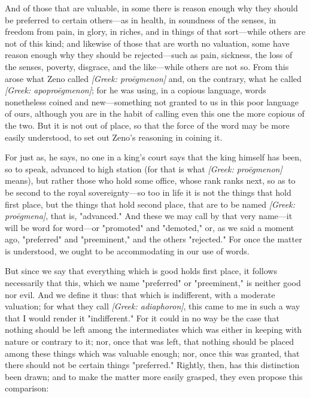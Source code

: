  And of those that are valuable, in some there is reason enough why they should be preferred to certain others—as in health, in soundness of the senses, in freedom from pain, in glory, in riches, and in things of that sort—while others are not of this kind; and likewise of those that are worth no valuation, some have reason enough why they should be rejected—such as pain, sickness, the loss of the senses, poverty, disgrace, and the like—while others are not so. From this arose what Zeno called \textit{[Greek: proēgmenon]} and, on the contrary, what he called \textit{[Greek: apoproēgmenon]}; for he was using, in a copious language, words nonetheless coined and new—something not granted to us in this poor language of ours, although you are in the habit of calling even this one the more copious of the two. But it is not out of place, so that the force of the word may be more easily understood, to set out Zeno's reasoning in coining it.

 For just as, he says, no one in a king's court says that the king himself has been, so to speak, advanced to high station (for that is what \textit{[Greek: proēgmenon]} means), but rather those who hold some office, whose rank ranks next, so as to be second to the royal sovereignty—so too in life it is not the things that hold first place, but the things that hold second place, that are to be named \textit{[Greek: proēgmena]}, that is, "advanced." And these we may call by that very name—it will be word for word—or "promoted" and "demoted," or, as we said a moment ago, "preferred" and "preeminent," and the others "rejected." For once the matter is understood, we ought to be accommodating in our use of words.

 But since we say that everything which is good holds first place, it follows necessarily that this, which we name "preferred" or "preeminent," is neither good nor evil. And we define it thus: that which is indifferent, with a moderate valuation; for what they call \textit{[Greek: adiaphoron]}, this came to me in such a way that I would render it "indifferent." For it could in no way be the case that nothing should be left among the intermediates which was either in keeping with nature or contrary to it; nor, once that was left, that nothing should be placed among these things which was valuable enough; nor, once this was granted, that there should not be certain things "preferred." Rightly, then, has this distinction been drawn; and to make the matter more easily grasped, they even propose this comparison:

